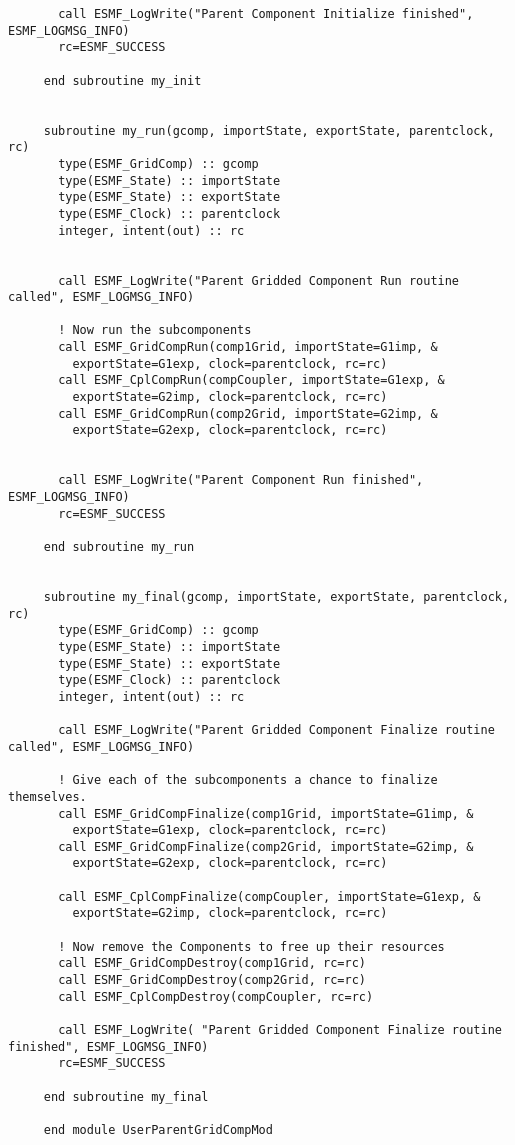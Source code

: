 \begin{verbatim}
       call ESMF_LogWrite("Parent Component Initialize finished", ESMF_LOGMSG_INFO)
       rc=ESMF_SUCCESS
 
     end subroutine my_init
 
 
     subroutine my_run(gcomp, importState, exportState, parentclock, rc)
       type(ESMF_GridComp) :: gcomp
       type(ESMF_State) :: importState
       type(ESMF_State) :: exportState
       type(ESMF_Clock) :: parentclock
       integer, intent(out) :: rc
 
      
       call ESMF_LogWrite("Parent Gridded Component Run routine called", ESMF_LOGMSG_INFO)
 
       ! Now run the subcomponents
       call ESMF_GridCompRun(comp1Grid, importState=G1imp, &
         exportState=G1exp, clock=parentclock, rc=rc)
       call ESMF_CplCompRun(compCoupler, importState=G1exp, &
         exportState=G2imp, clock=parentclock, rc=rc)
       call ESMF_GridCompRun(comp2Grid, importState=G2imp, &
         exportState=G2exp, clock=parentclock, rc=rc)
 
 
       call ESMF_LogWrite("Parent Component Run finished", ESMF_LOGMSG_INFO)
       rc=ESMF_SUCCESS
 
     end subroutine my_run
 
 
     subroutine my_final(gcomp, importState, exportState, parentclock, rc)
       type(ESMF_GridComp) :: gcomp
       type(ESMF_State) :: importState
       type(ESMF_State) :: exportState
       type(ESMF_Clock) :: parentclock
       integer, intent(out) :: rc
      
       call ESMF_LogWrite("Parent Gridded Component Finalize routine called", ESMF_LOGMSG_INFO)
 
       ! Give each of the subcomponents a chance to finalize themselves.
       call ESMF_GridCompFinalize(comp1Grid, importState=G1imp, &
         exportState=G1exp, clock=parentclock, rc=rc)
       call ESMF_GridCompFinalize(comp2Grid, importState=G2imp, &
         exportState=G2exp, clock=parentclock, rc=rc)
 
       call ESMF_CplCompFinalize(compCoupler, importState=G1exp, &
         exportState=G2imp, clock=parentclock, rc=rc)
 
       ! Now remove the Components to free up their resources
       call ESMF_GridCompDestroy(comp1Grid, rc=rc)
       call ESMF_GridCompDestroy(comp2Grid, rc=rc)
       call ESMF_CplCompDestroy(compCoupler, rc=rc)
 
       call ESMF_LogWrite( "Parent Gridded Component Finalize routine finished", ESMF_LOGMSG_INFO)
       rc=ESMF_SUCCESS
 
     end subroutine my_final
 
     end module UserParentGridCompMod
 
  \end{verbatim}
     
\setlength{\parskip}{\oldparskip}
\setlength{\parindent}{\oldparindent}
\setlength{\baselineskip}{\oldbaselineskip}
